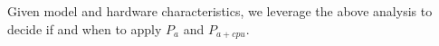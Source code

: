 Given model and hardware characteristics, we leverage the above analysis to decide if and when to apply $P_a$ and $P_{a+cpu}$.

\begin{comment}Activation partitioning and cpu checkpointing can significantly improve efficiency by increasing the training batch size. The increase in training batch size increases computation effieciency while also reducing the data parallel communication volume. Therefore, conservatively these techniques are effective as long as the reduction in data parallel communication volume is not out weighted by the communication overhead required by these optimizations. Here, we show the exact criteria, when $P_{a+cpu}$ improves efficiency via a communication volume analysis.

If we assume that the size of the checkpointed activations is $C_A$, then activation partitioning will incur a communication volume of $C_A$, since the communication volume of all-gather is equal to the message size. Similarly, CPU checkpointing will also incur a communication volume of $C_A$, as we need to transfer $C_A$ activations from CPU to the GPU memory.

With optimal activation checkpointing, $C_A$ is approximately equal to the square root of the total model activations \cite{optimal-checkpointing}, where the total model activation is highly model dependent, which makes it difficult to identify the exact communication volume overhead of $P_{a+cpu}$. However, we can come up with an exact communication volume in the context of transformer based language models.

For transformer based models such as the Bert or GPT, we generally checkpoint activations at the transformer layer boundary. Therefore, $C_A = batch \times seq\_length \times n \times h$ for a model  with $n$ layers, and $h$ hidden dimension. Comparatively, the data parallel communication volume for this model is $2 \Psi$ as described before, where $\Psi$ is the model size, which would be approximately $12 \times n \times h^2$ for a transformer based model such as the GPT-2. 
$C_A$ can become much larger than $2 \Psi$ for very large batch sizes. However, for modest batch size, $C_A$ can be much smaller than $2 \Psi$. If we consider $B_{data}$, $B_{gpu}$ and $B_{cpu}$ as the data-parallel bandwidth, gpu-gpu bandwidth and cpu-gpu memory bandwidth, $P_a$ improves efficiency as long as the following holds:

\begin{equation}
    \frac{batch \times seq\_length \times n \times h}{B_{gpu}} \leq \frac{24 \times n \times h^2}{B_{data}}  
\end{equation}

A similar equation can be derived for $P_{a+cpu}$. The above equation holds true for training very large models where the parameters and optimizer states occupy most of the memory, and the batch size we can fit is very small. Under such scenarios, $P_{a+cpu}$ offers significant efficiency improvement by allowing us to run larger batch sizes.
\end{comment}


 
 
 
 
